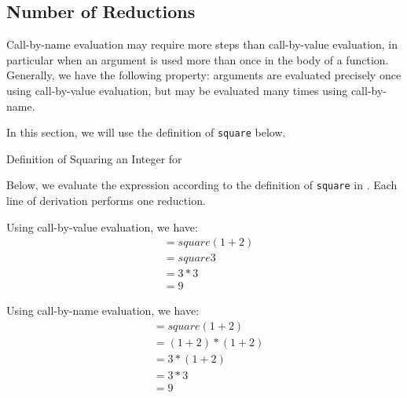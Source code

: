 \subsection{Number of Reductions}\label{subsec:Number_of_Reductions}
Call-by-name evaluation may require more steps than call-by-value evaluation, in particular when an argument is used more than once in the body of a function.
Generally, we have the following property: arguments are evaluated precisely once using call-by-value evaluation, but may be evaluated many times using call-by-name.

In this section, we will use the definition of \texttt{square} below.
\begin{listing}[h!tbp]
\caption{Definition of Squaring an Integer for }
\label{lst:Square_Definition}
\end{listing}

Below, we evaluate the expression  according to the definition of \texttt{square} in .
Each line of derivation performs one reduction.

Using call-by-value evaluation, we have:
\begin{align*}
  &= square (1+2) \\
  &= square 3 \\
  &= 3 * 3 \\
  &= 9
\end{align*}

Using call-by-name evaluation, we have:
\begin{align*}
  &= square (1+2) \\
  &= (1+2) * (1+2) \\
  &= 3 * (1+2) \\
  &= 3 * 3 \\
  &= 9
\end{align*}


